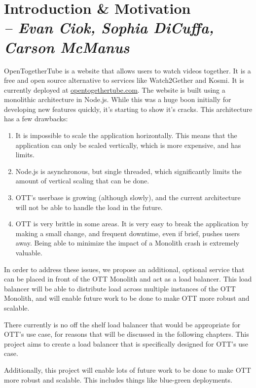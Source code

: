\chapter{Introduction \& Motivation \\
  \small{\textit{-- Evan Ciok, Sophia DiCuffa, Carson McManus}}
  \label{Chapter::Motivation}}

OpenTogetherTube is a website that allows users to watch videos together. It is a free and open source alternative to services like Watch2Gether and Kosmi. It is currently deployed at \href{https://opentogethertube.com}{opentogethertube.com}. The website is built using a monolithic architecture in Node.js. While this was a huge boon initially for developing new features quickly, it's starting to show it's cracks. This architecture has a few drawbacks:

\begin{enumerate}
  \item It is impossible to scale the application horizontally. This means that the application can only be scaled vertically, which is more expensive, and has limits.
  \item Node.js is asynchronous, but single threaded, which significantly limits the amount of vertical scaling that can be done.
  \item OTT's userbase is growing (although slowly), and the current architecture will not be able to handle the load in the future.
  \item OTT is very brittle in some areas. It is very easy to break the application by making a small change, and frequent downtime, even if brief, pushes users away. Being able to minimize the impact of a Monolith crash is extremely valuable.
\end{enumerate}

In order to address these issues, we propose an additional, optional service that can be placed in front of the OTT Monolith and act as a load balancer. This load balancer will be able to distribute load across multiple instances of the OTT Monolith, and will enable future work to be done to make OTT more robust and scalable.

There currently is no off the shelf load balancer that would be appropriate for OTT's use case, for reasons that will be discussed in the following chapters. This project aims to create a load balancer that is specifically designed for OTT's use case.

Additionally, this project will enable lots of future work to be done to make OTT more robust and scalable. This includes things like blue-green deployments.
